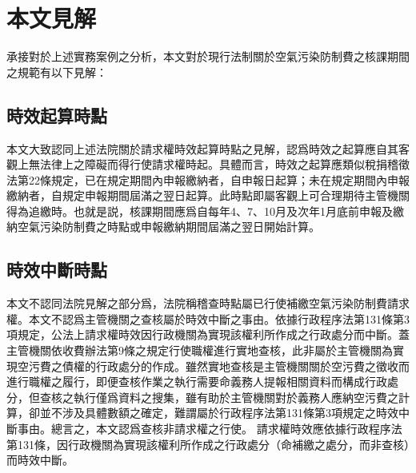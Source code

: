 \documentclass[11pt,a4paper]{article}
\begin{document}


\section{本文見解}


承接對於上述實務案例之分析，本文對於現行法制關於空氣污染防制費之核課期間之規範有以下見解：



\subsection{時效起算時點}



  



本文大致認同上述法院關於請求權時效起算時點之見解，認爲時效之起算應自其客觀上無法律上之障礙而得行使請求權時起。具體而言，時效之起算應類似稅捐稽徵法第22條規定，已在規定期間內申報繳納者，自申報日起算；未在規定期間內申報繳納者，自規定申報期間屆滿之翌日起算。此時點即屬客觀上可合理期待主管機關得為追繳時。也就是説，核課期間應爲自每年4、7、10月及次年1月底前申報及繳納空氣污染防制費之時點或申報繳納期間屆滿之翌日開始計算。



\subsection{時效中斷時點}



本文不認同法院見解之部分爲，法院稱稽查時點屬已行使補繳空氣污染防制費請求權。本文不認爲主管機關之查核屬於時效中斷之事由。依據行政程序法第131條第3項規定，公法上請求權時效因行政機關為實現該權利所作成之行政處分而中斷。蓋主管機關依收費辦法第9條之規定行使職權進行實地查核，此非屬於主管機關為實現空污費之債權的行政處分的作成。雖然實地查核是主管機關關於空污費之徵收而進行職權之履行，即便查核作業之執行需要命義務人提報相關資料而構成行政處分，但查核之執行僅爲資料之搜集，雖有助於主管機關對於義務人應納空污費之計算，卻並不涉及具體數額之確定，難謂屬於行政程序法第131條第3項規定之時效中斷事由。總言之，本文認爲查核非請求權之行使。
請求權時效應依據行政程序法第131條，因行政機關為實現該權利所作成之行政處分（命補繳之處分，而非查核）而時效中斷。
\end{document}
